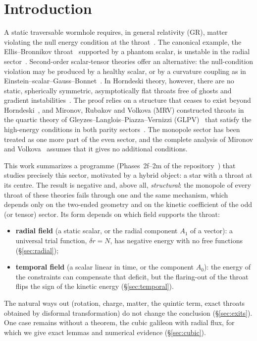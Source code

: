 \documentclass[11pt,a4paper]{article}
\theoremstyle{remark}
\begin{document}
\section{Introduction}

A static traversable wormhole requires, in general relativity (GR), matter violating the null energy condition at the throat~\cite{MorrisThorne}. The canonical example, the Ellis--Bronnikov throat~\cite{Ellis,Bronnikov} supported by a phantom scalar, is unstable in the radial sector~\cite{GonzalezGuzmanSarbach}. Second-order scalar-tensor theories offer an alternative: the null-condition violation may be produced by a healthy scalar, or by a curvature coupling as in Einstein--scalar--Gauss--Bonnet~\cite{KKK,Canate}. In Horndeski theory, however, there are no static, spherically symmetric, asymptotically flat throats free of ghosts and gradient instabilities~\cite{Rubakov,EvseevMelichev}. The proof relies on a structure that ceases to exist beyond Horndeski~\cite{Franciolini}, and Mironov, Rubakov and Volkova (MRV) constructed throats in the quartic theory of Gleyzes--Langlois--Piazza--Vernizzi (GLPV)~\cite{GLPV} that satisfy the high-energy conditions in both parity sectors~\cite{MRV1,MRV2,MRV3}. The monopole sector has been treated as one more part of the even sector, and the complete analysis of Mironov and Volkova~\cite{MironovVolkova} assumes that it gives no additional conditions.

This work summarizes a programme (Phases~2f--2m of the repository~\cite{repo}) that studies precisely this sector, motivated by a hybrid object: a star with a throat at its centre. The result is negative and, above all, \emph{structural}: the monopole of every throat of these theories fails through one and the same mechanism, which depends only on the two-ended geometry and on the kinetic coefficient of the odd (or tensor) sector. Its form depends on which field supports the throat:
\begin{itemize}
\item \textbf{radial field} (a static scalar, or the radial component $A_1$ of a vector): a universal trial function, $\delta r=N$, has negative energy with no free functions (\S\ref{sec:radial});
\item \textbf{temporal field} (a scalar linear in time, or the component $A_0$): the energy of the constraints can compensate that deficit, but the flaring-out of the throat flips the sign of the kinetic energy (\S\ref{sec:temporal}).
\end{itemize}
The natural ways out (rotation, charge, matter, the quintic term, exact throats obtained by disformal transformation) do not change the conclusion (\S\ref{sec:exits}). One case remains without a theorem, the cubic galileon with radial flux, for which we give exact lemmas and numerical evidence (\S\ref{sec:cubic}).
\end{document}
